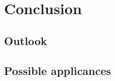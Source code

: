 \section{Conclusion}
\label{sec: discussion}

\subsection{Outlook}

\subsection{Possible applicances}
